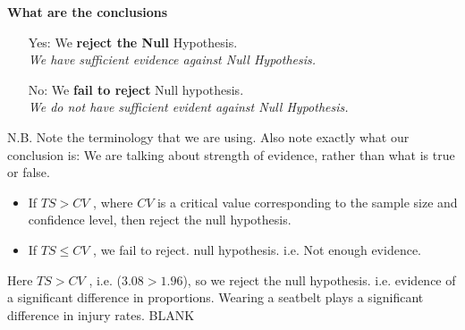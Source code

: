 \documentclass[a4paper,12pt]{article}
\begin{document}
\begin{framed}
\noindent \textbf{What are the conclusions}
	\begin{itemize} 
		
		\item[Yes:] We \textbf{reject the Null} Hypothesis. \\ \textit{We have sufficient evidence against Null Hypothesis.}
		
		\item[No:] We \textbf{fail to reject} Null hypothesis. \\ \textit{We do not have sufficient evident against Null Hypothesis.}
	\end{itemize}	
	{	\normalsize
		N.B. Note the terminology that we are using. Also note exactly what our conclusion is: We are talking about strength of evidence, rather than what is true or false.}
	
\end{framed}
	\smallskip
\begin{framed}
\begin{itemize}
	\item 	If $TS > CV$ , where $CV$ is a critical value corresponding to the sample size and confidence level, then reject the null hypothesis. 
	\item  If $TS \leq CV$ , we fail to reject. null hypothesis. i.e. Not enough evidence. 
	\end{itemize}	
\end{framed}	

\noindent Here $TS > CV$ , i.e. ($3.08 > 1.96$), so we reject the null hypothesis. i.e. evidence of a significant difference in proportions. Wearing a seatbelt plays a significant difference in injury rates.
\newpage
BLANK
		
	
\end{document}
